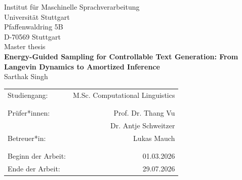 \documentclass[12pt,leqno,a4paper]{article}
\begin{document}
\begin{titlepage}
  \large
   \begin{center}
    Institut für Maschinelle Sprachverarbeitung\\
    Universität Stuttgart\\
    Pfaffenwaldring 5B\\
    D-70569 Stuttgart\\

    \vspace{2.5cm}
    Master thesis \\
    {\LARGE \bf Energy-Guided Sampling for Controllable Text Generation: From Langevin Dynamics to Amortized Inference} \\
    \vspace{2cm}
    Sarthak Singh\\
       \vfill
    \begin{tabular}[t]{lr}
    Studiengang: & M.Sc. Computational Linguistics \\
    \\
    \\
    {Prüfer*innen:} & Prof. Dr. Thang Vu\\
     & Dr. Antje Schweitzer\\
    {Betreuer*in:} & Lukas Mauch\\
    \\
    \\
    {Beginn der Arbeit:} & 01.03.2026\\ %
    {Ende der Arbeit:} & 29.07.2026\\
    \end{tabular}
  \end{center}
\setlength{\hoffset}{0cm}

  \normalsize
\end{titlepage}

\restoregeometry
\end{document}
